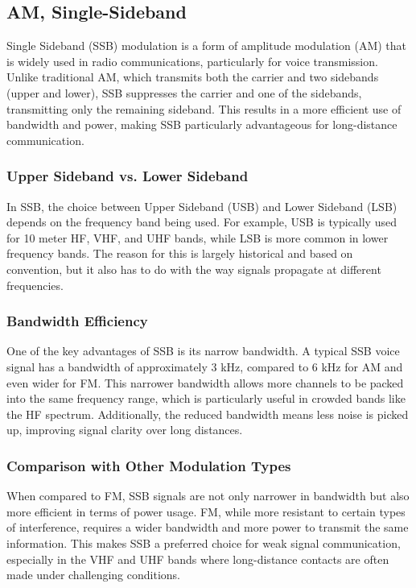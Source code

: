 \subsection{AM, Single-Sideband}
\label{subsec:am-ssb}

Single Sideband (SSB) modulation is a form of amplitude modulation (AM) that is widely used in radio communications, particularly for voice transmission. Unlike traditional AM, which transmits both the carrier and two sidebands (upper and lower), SSB suppresses the carrier and one of the sidebands, transmitting only the remaining sideband. This results in a more efficient use of bandwidth and power, making SSB particularly advantageous for long-distance communication.

\subsubsection*{Upper Sideband vs. Lower Sideband}
In SSB, the choice between Upper Sideband (USB) and Lower Sideband (LSB) depends on the frequency band being used. For example, USB is typically used for 10 meter HF, VHF, and UHF bands, while LSB is more common in lower frequency bands. The reason for this is largely historical and based on convention, but it also has to do with the way signals propagate at different frequencies.

\subsubsection*{Bandwidth Efficiency}
One of the key advantages of SSB is its narrow bandwidth. A typical SSB voice signal has a bandwidth of approximately 3 kHz, compared to 6 kHz for AM and even wider for FM. This narrower bandwidth allows more channels to be packed into the same frequency range, which is particularly useful in crowded bands like the HF spectrum. Additionally, the reduced bandwidth means less noise is picked up, improving signal clarity over long distances.

\subsubsection*{Comparison with Other Modulation Types}
When compared to FM, SSB signals are not only narrower in bandwidth but also more efficient in terms of power usage. FM, while more resistant to certain types of interference, requires a wider bandwidth and more power to transmit the same information. This makes SSB a preferred choice for weak signal communication, especially in the VHF and UHF bands where long-distance contacts are often made under challenging conditions.

